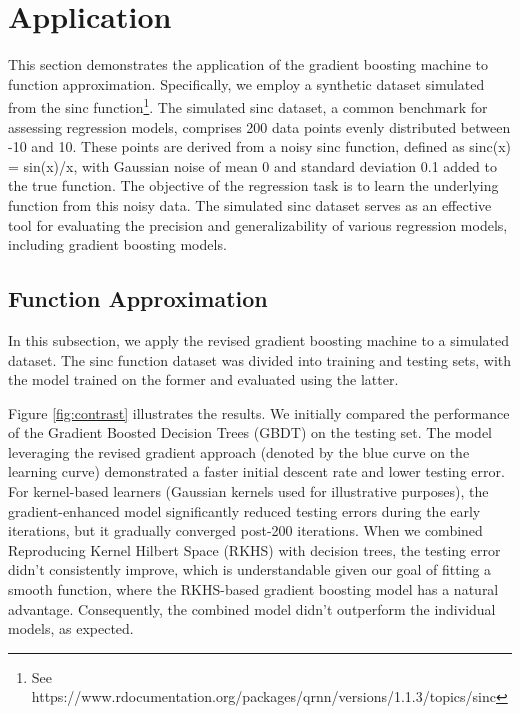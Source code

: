 \section{Application}
This section demonstrates the application of the gradient boosting machine to function approximation. Specifically, we employ a synthetic dataset simulated from the sinc function\footnote{See https://www.rdocumentation.org/packages/qrnn/versions/1.1.3/topics/sinc}. The simulated sinc dataset, a common benchmark for assessing regression models, comprises 200 data points evenly distributed between -10 and 10. These points are derived from a noisy sinc function, defined as sinc(x) = sin(x)/x, with Gaussian noise of mean 0 and standard deviation 0.1 added to the true function. The objective of the regression task is to learn the underlying function from this noisy data. The simulated sinc dataset serves as an effective tool for evaluating the precision and generalizability of various regression models, including gradient boosting models.

\subsection{Function Approximation}
In this subsection, we apply the revised gradient boosting machine to a simulated dataset. The sinc function dataset was divided into training and testing sets, with the model trained on the former and evaluated using the latter.

Figure \ref{fig:contrast} illustrates the results. We initially compared the performance of the Gradient Boosted Decision Trees (GBDT) on the testing set. The model leveraging the revised gradient approach (denoted by the blue curve on the learning curve) demonstrated a faster initial descent rate and lower testing error. For kernel-based learners (Gaussian kernels used for illustrative purposes), the gradient-enhanced model significantly reduced testing errors during the early iterations, but it gradually converged post-200 iterations. When we combined Reproducing Kernel Hilbert Space (RKHS) with decision trees, the testing error didn't consistently improve, which is understandable given our goal of fitting a smooth function, where the RKHS-based gradient boosting model has a natural advantage. Consequently, the combined model didn't outperform the individual models, as expected.

